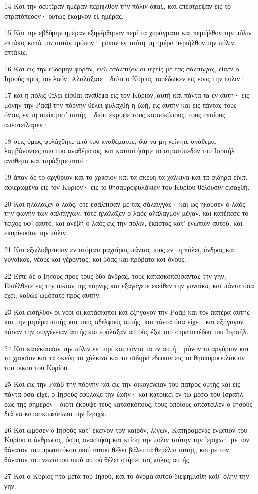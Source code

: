 \par 14 Και την δευτέραν ημέραν περιήλθον την πόλιν άπαξ, και επέστρεψαν εις το στρατόπεδον· ούτως έκαμνον εξ ημέρας.
\par 15 Και την εβδόμην ημέραν εξηγέρθησαν περί τα χαράγματα και περιήλθον την πόλιν επτάκις κατά τον αυτόν τρόπον· μόνον εν ταύτη τη ημέρα περιήλθον την πόλιν επτάκις.
\par 16 Και εις την εβδόμην φοράν, ενώ εσάλπιζον οι ιερείς με τας σάλπιγγας, είπεν ο Ιησούς προς τον λαόν, Αλαλάξατε· διότι ο Κύριος παρέδωκεν εις εσάς την πόλιν·
\par 17 και η πόλις θέλει είσθαι ανάθεμα εις τον Κύριον, αυτή και πάντα τα εν αυτή· εις μόνην την Ραάβ την πόρνην θέλει φυλαχθή η ζωή, εις αυτήν και εις πάντας τους όντας εν τη οικία μετ' αυτής· διότι έκρυψε τους κατασκόπους, τους οποίους απεστείλαμεν·
\par 18 σεις όμως φυλάχθητε από του αναθέματος, διά να μη γείνητε ανάθεμα, λαμβάνοντες από του αναθέματος, και καταστήσητε το στρατόπεδον του Ισραήλ ανάθεμα και ταράξητε αυτό·
\par 19 άπαν δε το αργύριον και το χρυσίον και τα σκεύη τα χάλκινα και τα σιδηρά είναι αφιερωμένα εις τον Κύριον· εις το θησαυροφυλάκιον του Κυρίου θέλουσιν εισαχθή.
\par 20 Και ηλάλαξεν ο λαός, ότε εσάλπισαν με τας σάλπιγγας· και ως ήκουσεν ο λαός την φωνήν των σαλπίγγων, τότε ηλάλαξεν ο λαός αλαλαγμόν μέγαν, και κατέπεσε το τείχος υφ' εαυτό, και ανέβη ο λαός εις την πόλιν, έκαστος κατ' ενώπιον αυτού, και εκυρίευσαν την πόλιν.
\par 21 Και εξωλόθρευσαν εν στόματι μαχαίρας πάντας τους εν τη πόλει, άνδρας και γυναίκας, νέους και γέροντας, και βόας και πρόβατα και όνους.
\par 22 Είπε δε ο Ιησούς προς τους δύο άνδρας, τους κατασκοπεύσαντας την γην, Εισέλθετε εις την οικίαν της πόρνης και εξαγάγετε εκείθεν την γυναίκα, και πάντα όσα έχει, καθώς ώμόσατε προς αυτήν.
\par 23 Και εισήλθον οι νέοι οι κατάσκοποι και εξήγαγον την Ραάβ και τον πατέρα αυτής και την μητέρα αυτής και τους αδελφούς αυτής, και πάντα όσα είχε· και εξήγαγον πάσαν την συγγένειαν αυτής και εφύλαξαν αυτούς έξω του στρατοπέδου του Ισραήλ.
\par 24 Και κατέκαυσαν την πόλιν εν πυρί και πάντα τα εν αυτή· μόνον το αργύριον και το χρυσίον και τα σκεύη τα χάλκινα και τα σιδηρά έδωκαν εις το θησαυροφυλάκιον του οίκου του Κυρίου.
\par 25 Και εις την Ραάβ την πόρνην και εις την οικογένειαν του πατρός αυτής και εις πάντα όσα είχε, ο Ιησούς εφύλαξε την ζωήν· και κατοικεί εν τω μέσω του Ισραήλ έως της σήμερον· διότι έκρυψε τους κατασκόπους, τους οποίους απέστειλεν ο Ιησούς διά να κατασκοπεύσωσι την Ιεριχώ.
\par 26 Και ώμοσεν ο Ιησούς κατ' εκείνον τον καιρόν, λέγων, Κατηραμένος ενώπιον του Κυρίου ο άνθρωπος, όστις αναστήση και κτίση την πόλιν ταύτην την Ιεριχώ· με τον θάνατον του πρωτοτόκου υιού αυτού θέλει βάλει τα θεμέλια αυτής, και με τον θάνατον του νεωτάτου υιού αυτού θέλει στήσει τας πύλας αυτής.
\par 27 Και ο Κύριος ήτο μετά του Ιησού, και το όνομα αυτού διεφημίσθη καθ' όλην την γην.

